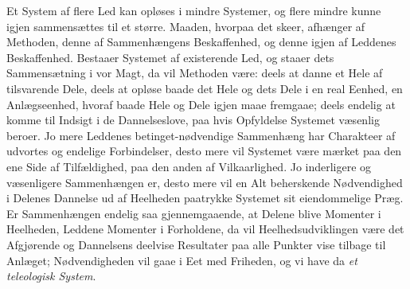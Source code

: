 \documentclass[12pt]{book}
\newcommand{\apage}[1]{\marginnote{\footnotesize\textit{[#1]}}}
\begin{document}
Et System af flere Led kan opløses i mindre Systemer, og flere mindre
kunne igjen sammensættes til et større. Maaden, hvorpaa det skeer,
afhænger af Methoden, denne af Sammenhængens Beskaffenhed, og denne igjen
af Leddenes Beskaffenhed. Bestaaer Systemet af existerende Led, og staaer
dets Sammensætning i vor Magt, da vil Methoden være: deels at danne et
Hele af tilsvarende Dele, deels at opløse baade det Hele og dets Dele i en
real Eenhed, en Anlægseenhed, hvoraf baade Hele og Dele igjen maae
fremgaae; deels endelig at komme til Indsigt i de Dannelseslove, paa hvis
Opfyldelse Systemet væsenlig beroer. Jo mere Leddenes betinget-nødvendige
Sammenhæng har Charakteer af udvortes og endelige Forbindelser, desto mere
vil Systemet være mærket paa den ene Side af Tilfældighed, paa den anden
af Vilkaarlighed. Jo inderligere og væsenligere Sammenhængen er, desto
mere vil en Alt beherskende  \apage{71} Nødvendighed i Delenes Dannelse ud af
Heelheden paatrykke Systemet sit eiendommelige Præg. Er Sammenhængen
endelig saa gjennemgaaende, at Delene blive Momenter i Heelheden, Leddene
Momenter i Forholdene, da vil Heelhedsudviklingen være det Afgjørende og
Dannelsens deelvise Resultater paa alle Punkter vise tilbage til Anlæget;
Nødvendigheden vil gaae i Eet med Friheden, og vi have da \emph{et teleologisk
System}.
\end{document}
